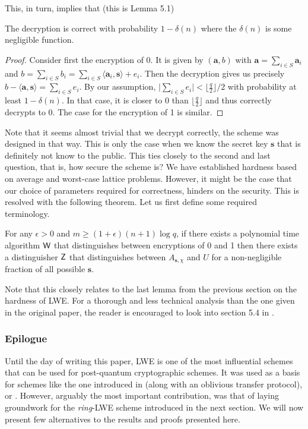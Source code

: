 This, in turn, implies that (this is Lemma 5.1)
\begin{lemma}
    The decryption is correct with probability $1 - \delta(n)$ where the $\delta(n)$ is some negligible function.
\end{lemma}

\begin{proof}
    Consider first the encryption of 0. It is given by $(\bm{a}, b)$ with $\bm{a} = \sum_{i \in S}\bm{a}_i$ and $b = \sum_{i \in S} b_i = \sum_{i \in S} \langle \bm{a}_i, \bm{s} \rangle + e_i$. Then the decryption gives us precisely $b - \langle \bm{a}, \bm{s} \rangle = \sum_{i \in S} e_i$. By our assumption, $\big| \sum_{i \in S} e_i \big| < \bigl \lfloor \frac{q}{2} \bigr \rfloor /2$ with probability at least $1 - \delta(n)$. In that case, it is closer to 0 than $\bigl \lfloor \frac{q}{2} \bigr \rfloor$ and thus correctly decrypts to 0. The case for the encryption of 1 is similar.
\end{proof}

Note that it seems almost trivial that we decrypt correctly, the scheme was designed in that way. This is only the case when we know the secret key $\bm{s}$ that is definitely not know to the public. This ties closely to the second and last question, that is, how secure the scheme is? We have established hardness based on average and worst-case lattice problems. However, it might be the case that our choice of parameters required for correctness, hinders on the security. This is resolved with the following theorem. Let us first define some required terminology.

\begin{proposition}
    For any $\epsilon > 0$ and $m \geq (1 + \epsilon)(n + 1) \log q$, if there exists a polynomial time algorithm $\textsf{W}$ that distinguishes between encryptions of 0 and 1 then there exists a distinguisher $\textsf{Z}$ that distinguishes between $A_{\bm{s}, \chi}$ and $U$ for a non-negligible fraction of all possible $\bm{s}$.
\end{proposition}
Note that this closely relates to the last lemma from the previous section on the hardness of LWE. For a thorough and less technical analysis than the one given in the original paper, the reader is encouraged to look into section 5.4 in \cite{Micci2009}.

\subsubsection*{Epilogue}
Until the day of writing this paper, LWE is one of the most influential schemes that can be used for post-quantum cryptographic schemes. It was used as a basis for schemes like the one introduced in \cite{ot-lwe} (along with an oblivious transfer protocol), \cite{lwe-scheme1} or \cite{lwe-scheme2}. However, arguably the most important contribution, was that of laying groundwork for the \textit{ring}-LWE scheme introduced in the next section. We will now present few alternatives to the results and proofs presented here.\\


